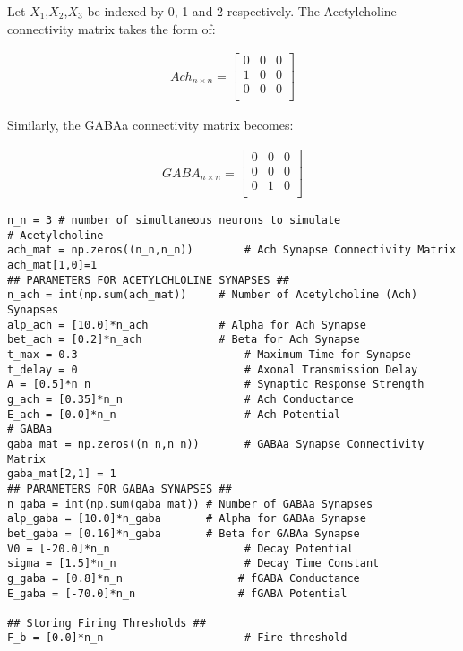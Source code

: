 \documentclass[10pt,letterpaper]{article}
\begin{document}
Let $X_1$,$X_2$,$X_3$ be indexed by 0, 1 and 2 respectively. The Acetylcholine connectivity matrix takes the form of:

\begin{eqnarray}
Ach_{n\times n}=
\begin{bmatrix}
0&0&0\\
1&0&0\\
0&0&0\\
\end{bmatrix}
\end{eqnarray}

Similarly, the GABAa connectivity matrix becomes:

\begin{eqnarray}
GABA_{n\times n}=
\begin{bmatrix}
0&0&0\\
0&0&0\\
0&1&0\\
\end{bmatrix}
\end{eqnarray}

\begin{verbatim}
n_n = 3 # number of simultaneous neurons to simulate
# Acetylcholine
ach_mat = np.zeros((n_n,n_n))        # Ach Synapse Connectivity Matrix
ach_mat[1,0]=1
## PARAMETERS FOR ACETYLCHLOLINE SYNAPSES ##
n_ach = int(np.sum(ach_mat))     # Number of Acetylcholine (Ach) Synapses 
alp_ach = [10.0]*n_ach           # Alpha for Ach Synapse
bet_ach = [0.2]*n_ach            # Beta for Ach Synapse
t_max = 0.3                          # Maximum Time for Synapse
t_delay = 0                          # Axonal Transmission Delay
A = [0.5]*n_n                        # Synaptic Response Strength
g_ach = [0.35]*n_n                   # Ach Conductance
E_ach = [0.0]*n_n                    # Ach Potential
# GABAa
gaba_mat = np.zeros((n_n,n_n))       # GABAa Synapse Connectivity Matrix
gaba_mat[2,1] = 1
## PARAMETERS FOR GABAa SYNAPSES ##
n_gaba = int(np.sum(gaba_mat)) # Number of GABAa Synapses
alp_gaba = [10.0]*n_gaba       # Alpha for GABAa Synapse
bet_gaba = [0.16]*n_gaba       # Beta for GABAa Synapse
V0 = [-20.0]*n_n                     # Decay Potential
sigma = [1.5]*n_n                    # Decay Time Constant
g_gaba = [0.8]*n_n                  # fGABA Conductance
E_gaba = [-70.0]*n_n                # fGABA Potential

## Storing Firing Thresholds ##
F_b = [0.0]*n_n                      # Fire threshold
\end{verbatim}
\end{document}
